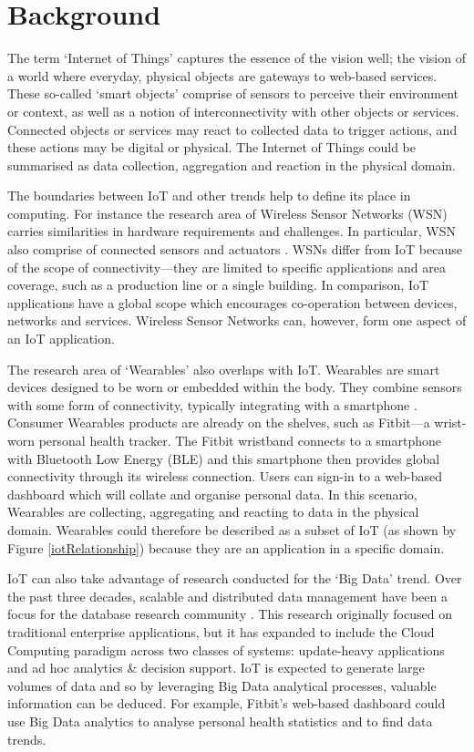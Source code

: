 \chapter{Background}
\label{Chapter:Background}
  The term `Internet of Things' captures the essence of the vision well; the vision of a world where everyday, physical objects are gateways to web-based services. These so-called `smart objects' comprise of sensors to perceive their environment or context, as well as a notion of interconnectivity with other objects or services. Connected objects or services may react to collected data to trigger actions, and these actions may be digital or physical. The Internet of Things could be summarised as data collection, aggregation and reaction in the physical domain.

  The boundaries between IoT and other trends help to define its place in computing. For instance the research area of Wireless Sensor Networks (WSN) carries similarities in hardware requirements and challenges. In particular, WSN also comprise of connected sensors and actuators \citep{Mottola:2011}. WSNs differ from IoT because of the scope of connectivity---they are limited to specific applications and area coverage, such as a production line or a single building. In comparison, IoT applications have a global scope which encourages co-operation between devices, networks and services. Wireless Sensor Networks can, however, form one aspect of an IoT application.

  The research area of `Wearables' also overlaps with IoT. Wearables are smart devices designed to be worn or embedded within the body. They combine sensors with some form of connectivity, typically integrating with a smartphone \citep{6844949}. Consumer Wearables products are already on the shelves, such as Fitbit---a wrist-worn personal health tracker. The Fitbit wristband connects to a smartphone with Bluetooth Low Energy (BLE) and this smartphone then provides global connectivity through its wireless connection. Users can sign-in to a web-based dashboard which will collate and organise personal data. In this scenario, Wearables are collecting, aggregating and reacting to data in the physical domain. Wearables could therefore be described as a subset of IoT (as shown by Figure \ref{iotRelationship}) because they are an application in a specific domain.

  IoT can also take advantage of research conducted for the `Big Data' trend. Over the past three decades, scalable and distributed data management have been a focus for the database research community \citep{Agrawal}. This research originally focused on traditional enterprise applications, but it has expanded to include the Cloud Computing paradigm across two classes of systems: update-heavy applications and ad hoc analytics \& decision support. IoT is expected to generate large volumes of data and so by leveraging Big Data analytical processes, valuable information can be deduced. For example, Fitbit's web-based dashboard could use Big Data analytics to analyse personal health statistics and to find data trends. 

